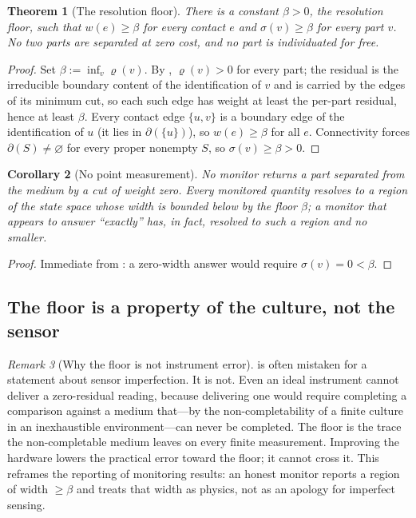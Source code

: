 \documentclass[11pt,twocolumn,a4paper]{article}
\theoremstyle{thmstyle}
\newtheorem{theorem}{Theorem}[section]
\newtheorem{corollary}[theorem]{Corollary}
\theoremstyle{definition}
\theoremstyle{remark}
\newtheorem{remark}[theorem]{Remark}
\newcommand{\cut}{\partial}
\newcommand{\floorc}{\beta}
\newcommand{\wt}{w}
\begin{document}
\begin{theorem}[The resolution floor]
\label{thm:floor}
There is a constant $\floorc>0$, the \emph{resolution floor}, such that
$\wt(e)\ge\floorc$ for every contact $e$ and $\sigma(v)\ge\floorc$ for
every part $v$. No two parts are separated at zero cost, and no part is
individuated for free.
\end{theorem}

\begin{proof}
Set $\floorc:=\inf_v\varrho(v)$. By ,
$\varrho(v)>0$ for every part; the residual is the irreducible boundary
content of the identification of $v$ and is carried by the edges of its
minimum cut, so each such edge has weight at least the per-part residual,
hence at least $\floorc$. Every contact edge $\{u,v\}$ is a boundary edge
of the identification of $u$ (it lies in $\cut(\{u\})$), so $\wt(e)\ge
\floorc$ for all $e$. Connectivity forces $\cut(S)\neq\varnothing$ for
every proper nonempty $S$, so $\sigma(v)\ge\floorc>0$.
\end{proof}

\begin{corollary}[No point measurement]
\label{cor:no-point}
No monitor returns a part separated from the medium by a cut of weight
zero. Every monitored quantity resolves to a region of the state space
whose width is bounded below by the floor $\floorc$; a monitor that appears
to answer ``exactly'' has, in fact, resolved to such a region and no
smaller.
\end{corollary}

\begin{proof}
Immediate from : a zero-width answer would require
$\sigma(v)=0<\floorc$.
\end{proof}

\subsection{The floor is a property of the culture, not the sensor}

\begin{remark}[Why the floor is not instrument error]
\label{rem:floor-not-error}
 is often mistaken for a statement about sensor
imperfection. It is not. Even an ideal instrument cannot deliver a
zero-residual reading, because delivering one would require completing a
comparison against a medium that---by the non-completability of a finite
culture in an inexhaustible environment---can never be completed. The floor
is the trace the non-completable medium leaves on every finite measurement.
Improving the hardware lowers the practical error toward the floor; it
cannot cross it. This reframes the reporting of monitoring results: an
honest monitor reports a region of width $\ge\floorc$ and treats that width
as physics, not as an apology for imperfect sensing.
\end{remark}
\end{document}
